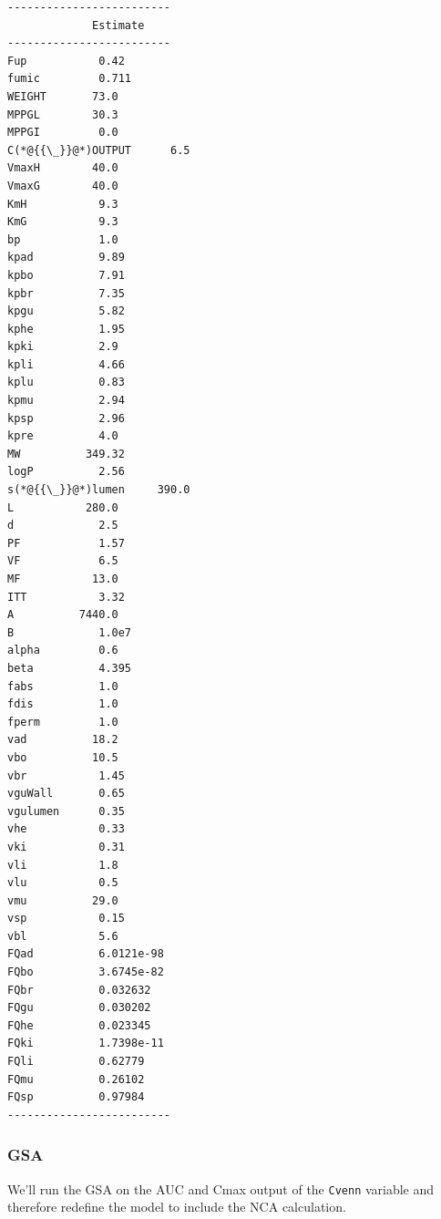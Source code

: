 \documentclass[12pt,a4paper]{article}
\begin{document}
\begin{lstlisting}
-------------------------
             Estimate
-------------------------
Fup           0.42
fumic         0.711
WEIGHT       73.0
MPPGL        30.3
MPPGI         0.0
C(*@{{\_}}@*)OUTPUT      6.5
VmaxH        40.0
VmaxG        40.0
KmH           9.3
KmG           9.3
bp            1.0
kpad          9.89
kpbo          7.91
kpbr          7.35
kpgu          5.82
kphe          1.95
kpki          2.9
kpli          4.66
kplu          0.83
kpmu          2.94
kpsp          2.96
kpre          4.0
MW          349.32
logP          2.56
s(*@{{\_}}@*)lumen     390.0
L           280.0
d             2.5
PF            1.57
VF            6.5
MF           13.0
ITT           3.32
A          7440.0
B             1.0e7
alpha         0.6
beta          4.395
fabs          1.0
fdis          1.0
fperm         1.0
vad          18.2
vbo          10.5
vbr           1.45
vguWall       0.65
vgulumen      0.35
vhe           0.33
vki           0.31
vli           1.8
vlu           0.5
vmu          29.0
vsp           0.15
vbl           5.6
FQad          6.0121e-98
FQbo          3.6745e-82
FQbr          0.032632
FQgu          0.030202
FQhe          0.023345
FQki          1.7398e-11
FQli          0.62779
FQmu          0.26102
FQsp          0.97984
-------------------------
\end{lstlisting}


\subsubsection{GSA}
We'll run the GSA on the AUC and Cmax output of the \texttt{Cvenn} variable and therefore redefine the model to include the NCA calculation.
\end{document}
